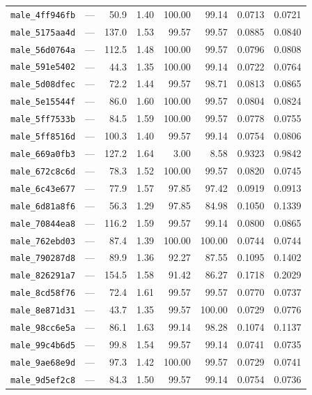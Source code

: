 \begin{longtable}{lrrrrrrr}
\texttt{male\_4ff946fb} & --- & 50.9 & 1.40 & 100.00 & 99.14 & 0.0713 & 0.0721 \\
\texttt{male\_5175aa4d} & --- & 137.0 & 1.53 & 99.57 & 99.57 & 0.0885 & 0.0840 \\
\texttt{male\_56d0764a} & --- & 112.5 & 1.48 & 100.00 & 99.57 & 0.0796 & 0.0808 \\
\texttt{male\_591e5402} & --- & 44.3 & 1.35 & 100.00 & 99.14 & 0.0722 & 0.0764 \\
\texttt{male\_5d08dfec} & --- & 72.2 & 1.44 & 99.57 & 98.71 & 0.0813 & 0.0865 \\
\texttt{male\_5e15544f} & --- & 86.0 & 1.60 & 100.00 & 99.57 & 0.0804 & 0.0824 \\
\texttt{male\_5ff7533b} & --- & 84.5 & 1.59 & 100.00 & 99.57 & 0.0778 & 0.0755 \\
\texttt{male\_5ff8516d} & --- & 100.3 & 1.40 & 99.57 & 99.14 & 0.0754 & 0.0806 \\
\texttt{male\_669a0fb3} & --- & 127.2 & 1.64 & 3.00 & 8.58 & 0.9323 & 0.9842 \\
\texttt{male\_672c8c6d} & --- & 78.3 & 1.52 & 100.00 & 99.57 & 0.0820 & 0.0745 \\
\texttt{male\_6c43e677} & --- & 77.9 & 1.57 & 97.85 & 97.42 & 0.0919 & 0.0913 \\
\texttt{male\_6d81a8f6} & --- & 56.3 & 1.29 & 97.85 & 84.98 & 0.1050 & 0.1339 \\
\texttt{male\_70844ea8} & --- & 116.2 & 1.59 & 99.57 & 99.14 & 0.0800 & 0.0865 \\
\texttt{male\_762ebd03} & --- & 87.4 & 1.39 & 100.00 & 100.00 & 0.0744 & 0.0744 \\
\texttt{male\_790287d8} & --- & 89.9 & 1.36 & 92.27 & 87.55 & 0.1095 & 0.1402 \\
\texttt{male\_826291a7} & --- & 154.5 & 1.58 & 91.42 & 86.27 & 0.1718 & 0.2029 \\
\texttt{male\_8cd58f76} & --- & 72.4 & 1.61 & 99.57 & 99.57 & 0.0770 & 0.0737 \\
\texttt{male\_8e871d31} & --- & 43.7 & 1.35 & 99.57 & 100.00 & 0.0729 & 0.0776 \\
\texttt{male\_98cc6e5a} & --- & 86.1 & 1.63 & 99.14 & 98.28 & 0.1074 & 0.1137 \\
\texttt{male\_99c4b6d5} & --- & 99.8 & 1.54 & 99.57 & 99.14 & 0.0741 & 0.0735 \\
\texttt{male\_9ae68e9d} & --- & 97.3 & 1.42 & 100.00 & 99.57 & 0.0729 & 0.0741 \\
\texttt{male\_9d5ef2c8} & --- & 84.3 & 1.50 & 99.57 & 99.14 & 0.0754 & 0.0736 \\

\end{longtable}
